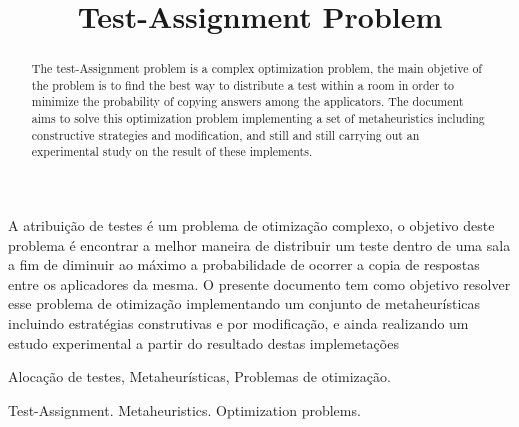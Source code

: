 \documentclass[a4paper,11pt]{article}
\begin{document}
\title{Test-Assignment Problem} 

\maketitle
\thispagestyle{fancy}

\author{
}

\author{ 
}

\vspace{8mm}
\begin{resumo}
A atribui\c c\~ao de testes \'e um problema de otimiza\c c\~ao complexo, o objetivo deste problema \'e encontrar a melhor maneira de 
distribuir um teste dentro de uma sala a fim de diminuir ao m\'aximo a probabilidade de ocorrer a copia de respostas 
entre os aplicadores da mesma. O presente documento tem como objetivo resolver esse problema de otimiza\c c\~ao implementando 
um conjunto de metaheur\'isticas incluindo estrat\'egias construtivas e por modifica\c c\~ao, e ainda realizando um estudo experimental a partir do resultado 
destas implemeta\c c\~oes
 \end{resumo}

\bigskip
\begin{palchaves}
Aloca\c c\~ao de testes, Metaheur\'isticas, Problemas de otimiza\c c\~ao.

\bigskip
{}
\end{palchaves}


\vspace{8mm}

\begin{abstract}
The test-Assignment problem is a complex optimization problem, the main objetive of the problem is to find the best way to distribute a test within 
a room in order to minimize the probability of copying answers among the applicators. The document aims to solve this optimization problem implementing a
set of metaheuristics including constructive strategies and modification, and still and still carrying out an experimental study on the result
of these implements.

\end{abstract}

\bigskip
\begin{keywords}
Test-Assignment. Metaheuristics. Optimization problems.

\bigskip
{}
\end{keywords}
\end{document}
